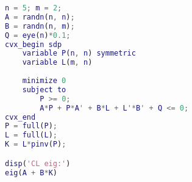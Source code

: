 \begin{lstlisting}[language=Matlab]
n = 5; m = 2;
A = randn(n, n);
B = randn(n, m);
Q = eye(n)*0.1;
cvx_begin sdp
    variable P(n, n) symmetric
    variable L(m, n)
    
    minimize 0
    subject to
    	P >= 0;
        A*P + P*A' + B*L + L'*B' + Q <= 0;
cvx_end
P = full(P);
L = full(L);
K = L*pinv(P);

disp('CL eig:')
eig(A + B*K)
\end{lstlisting}